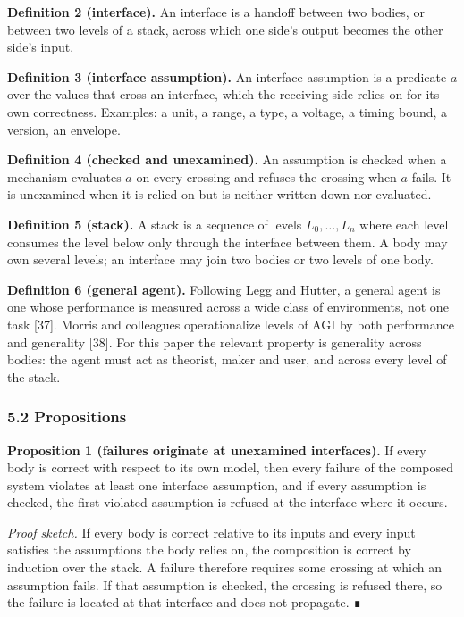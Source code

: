 \documentclass[
  10pt,
]{article}
\begin{document}
\textbf{Definition 2 (interface).} An interface is a handoff between two
bodies, or between two levels of a stack, across which one side's output
becomes the other side's input.

\textbf{Definition 3 (interface assumption).} An interface assumption is
a predicate \(a\) over the values that cross an interface, which the
receiving side relies on for its own correctness. Examples: a unit, a
range, a type, a voltage, a timing bound, a version, an envelope.

\textbf{Definition 4 (checked and unexamined).} An assumption is checked
when a mechanism evaluates \(a\) on every crossing and refuses the
crossing when \(a\) fails. It is unexamined when it is relied on but is
neither written down nor evaluated.

\textbf{Definition 5 (stack).} A stack is a sequence of levels
\(L_0, \dots, L_n\) where each level consumes the level below only
through the interface between them. A body may own several levels; an
interface may join two bodies or two levels of one body.

\textbf{Definition 6 (general agent).} Following Legg and Hutter, a
general agent is one whose performance is measured across a wide class
of environments, not one task {[}37{]}. Morris and colleagues
operationalize levels of AGI by both performance and generality
{[}38{]}. For this paper the relevant property is generality across
bodies: the agent must act as theorist, maker and user, and across every
level of the stack.

\subsubsection{5.2 Propositions}\label{propositions}

\textbf{Proposition 1 (failures originate at unexamined interfaces).} If
every body is correct with respect to its own model, then every failure
of the composed system violates at least one interface assumption, and
if every assumption is checked, the first violated assumption is refused
at the interface where it occurs.

\emph{Proof sketch.} If every body is correct relative to its inputs and
every input satisfies the assumptions the body relies on, the
composition is correct by induction over the stack. A failure therefore
requires some crossing at which an assumption fails. If that assumption
is checked, the crossing is refused there, so the failure is located at
that interface and does not propagate. ∎
\end{document}

